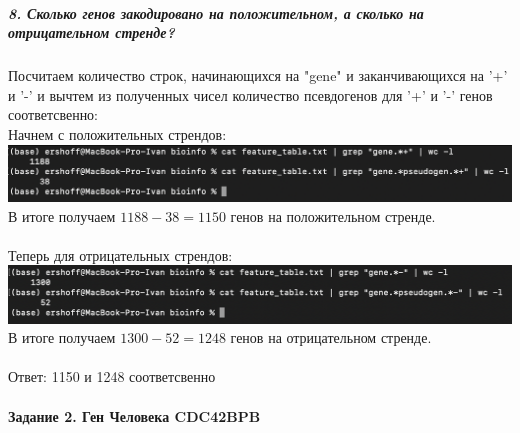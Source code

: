\documentclass[12pt]{article}
\begin{document}
\subparagraph{8. Сколько генов закодировано на положительном, а сколько на отрицательном стренде?\\}
Посчитаем количество строк, начинающихся на "gene" и заканчивающихся на '+' и '-' и вычтем из полученных чисел количество псевдогенов для '+' и '-' генов соответсвенно:\\
Начнем с положительных стрендов:\\
\includegraphics[width=\textwidth]{image/image9.png}\\
В итоге получаем $1188 - 38 = 1150$ генов на положительном стренде.\\\\
Теперь для отрицательных стрендов:\\
\includegraphics[width=\textwidth]{image/image10.png}\\
В итоге получаем $1300 - 52 = 1248$ генов на отрицательном стренде.\\\\
Ответ: 1150 и 1248 соответсвенно

\pagebreak
\paragraph{Задание 2. Ген Человека CDC42BPB}
\end{document}
